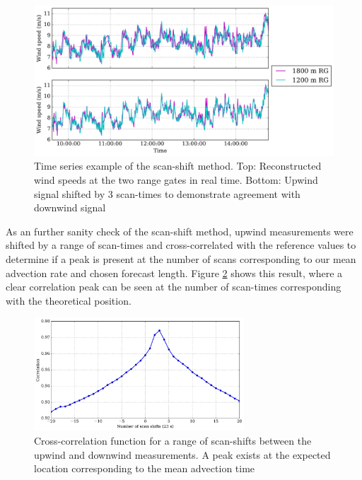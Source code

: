 \begin{figure}[htbp]
    \centering
        \includegraphics[width=1.0\textwidth]{graphics/results/waffle/waffle_scan_shift_example.png}
    \caption{Time series example of the scan-shift method. Top: Reconstructed wind speeds at the two range gates in real time. Bottom: Upwind signal shifted by 3 scan-times to demonstrate agreement with downwind signal}
    \label{fig:waffle_scan_shift_example}
\end{figure}

As an further sanity check of the scan-shift method, upwind measurements were shifted by a range of scan-times and cross-correlated with the reference values to determine if a peak is present at the number of scans corresponding to our mean advection rate and chosen forecast length. Figure \ref{fig:waffle_1200_shifted1800_corrplot} shows this result, where a clear correlation peak can be seen at the number of scan-times corresponding with the theoretical position.

\begin{figure}[htbp]
    \centering
        \includegraphics[width=0.7\textwidth]{graphics/results/waffle/waffle_1200_shifted1800_corrplot.png}
    \caption{Cross-correlation function for a range of scan-shifts between the upwind and downwind measurements. A peak exists at the expected location corresponding to the mean advection time}
    \label{fig:waffle_1200_shifted1800_corrplot}
\end{figure}

